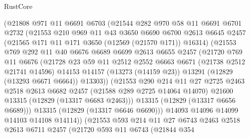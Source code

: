 \begin{lexlean}{RustCore}
\begin{coremodule}
            (@21808
              @971
              @11
              @6691
              @6703
              (@21544
                @282
                @970
                @58
                @11
                @6691
                @6701
                @2732
                (@21553
                  @210
                  @969
                  @11
                  @43
                  @3650
                  @6690
                  @6700
                  @2613
                  @6645
                  @2457
                  (@21565 @171 @11 @171 @3650 (@12569 (@21570 @171)) @16314)
                  (@21553
                    @769
                    @292
                    @11
                    @40
                    @6676
                    @6689
                    @6699
                    @2613
                    @6655
                    @2457
                    (@21720
                      @769
                      @11
                      @6676
                      (@21728
                        @23
                        @59
                        @11
                        @2512
                        @2552
                        @6663
                        @6671
                        (@21738 @2512 @21741 @14596)
                        @14153
                        @14157
                        (@13273 (@14159 @23))
                        @13291
                        (@12829 (@13293 @6671 @6664))
                        @13303))
                    (@21553
                      @290
                      @214
                      @11
                      @27
                      @2725
                      @2463
                      @2518
                      @2613
                      @6682
                      @2457
                      (@21588 @289 @2725 @14064 @14070)
                      @21600
                      @13315
                      (@12829 (@13317 @6683 @2463)))
                    @13315
                    (@12829 (@13317 @6656 @6689)))
                  @13315
                  (@12829 (@13317 @6646 @6690)))
                @14093
                @14096
                @14099
                @14103
                @14108
                @14114))
            (@21553
              @593
              @214
              @11
              @27
              @6743
              @2463
              @2518
              @2613
              @6711
              @2457
              (@21720
                @593
                @11
                @6743
                (@21844
                  @354

\end{coremodule}
\end{lexlean}
